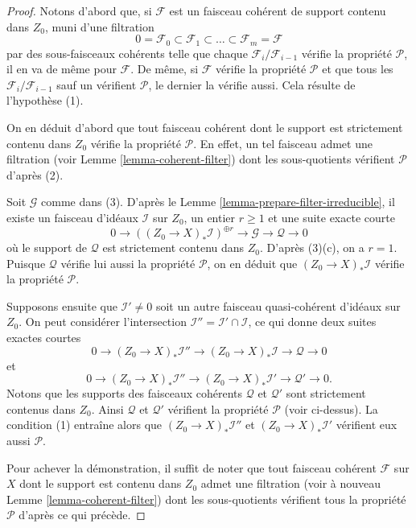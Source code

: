 \begin{proof}
Notons d'abord que, si $\mathcal{F}$ est un faisceau cohérent de support
contenu dans $Z_0$, muni d'une filtration
$$
0 = \mathcal{F}_0 \subset \mathcal{F}_1 \subset
\ldots \subset \mathcal{F}_m = \mathcal{F}
$$
par des sous-faisceaux cohérents telle que chaque $\mathcal{F}_i/\mathcal{F}_{i - 1}$
vérifie la propriété $\mathcal{P}$, il en va de même pour $\mathcal{F}$. De même, si $\mathcal{F}$
vérifie la propriété $\mathcal{P}$ et que tous les
$\mathcal{F}_i/\mathcal{F}_{i - 1}$ sauf un vérifient $\mathcal{P}$,
le dernier la vérifie aussi. Cela résulte de l'hypothèse (1).

\medskip\noindent
On en déduit d'abord que tout faisceau cohérent dont le support
est strictement contenu dans $Z_0$ vérifie la propriété $\mathcal{P}$. En effet, un tel
faisceau admet une filtration (voir Lemme \ref{lemma-coherent-filter})
dont les sous-quotients vérifient $\mathcal{P}$ d'après (2).

\medskip\noindent
Soit $\mathcal{G}$ comme dans (3). D'après le Lemme \ref{lemma-prepare-filter-irreducible},
il existe un faisceau d'idéaux $\mathcal{I}$ sur $Z_0$, un
entier $r \geq 1$ et une suite exacte courte
$$
0 \to
\left((Z_0 \to X)_*\mathcal{I}\right)^{\oplus r} \to
\mathcal{G} \to
\mathcal{Q} \to 0
$$
où le support de $\mathcal{Q}$ est strictement contenu dans $Z_0$.
D'après (3)(c), on a $r = 1$. Puisque $\mathcal{Q}$ vérifie lui aussi la propriété $\mathcal{P}$,
on en déduit que $(Z_0 \to X)_*\mathcal{I}$ vérifie la propriété
$\mathcal{P}$.

\medskip\noindent
Supposons ensuite que $\mathcal{I}' \not = 0$ soit un autre faisceau quasi-cohérent
d'idéaux sur $Z_0$. On peut considérer l'intersection
$\mathcal{I}'' = \mathcal{I}' \cap \mathcal{I}$, ce qui donne
deux suites exactes courtes
$$
0 \to
(Z_0 \to X)_*\mathcal{I}'' \to
(Z_0 \to X)_*\mathcal{I} \to
\mathcal{Q} \to 0
$$
et
$$
0 \to
(Z_0 \to X)_*\mathcal{I}'' \to
(Z_0 \to X)_*\mathcal{I}' \to
\mathcal{Q}' \to 0.
$$
Notons que les supports des faisceaux cohérents $\mathcal{Q}$ et
$\mathcal{Q}'$ sont strictement contenus dans $Z_0$.
Ainsi $\mathcal{Q}$ et $\mathcal{Q}'$ vérifient la propriété $\mathcal{P}$
(voir ci-dessus). La condition (1) entraîne alors
que $(Z_0 \to X)_*\mathcal{I}''$ et $(Z_0 \to X)_*\mathcal{I}'$
vérifient eux aussi $\mathcal{P}$.

\medskip\noindent
Pour achever la démonstration, il suffit de noter que tout faisceau cohérent
$\mathcal{F}$ sur $X$ dont le support est contenu dans $Z_0$ admet une filtration
(voir à nouveau Lemme \ref{lemma-coherent-filter}) dont les sous-quotients
vérifient tous la propriété $\mathcal{P}$ d'après ce qui précède.
\end{proof}

